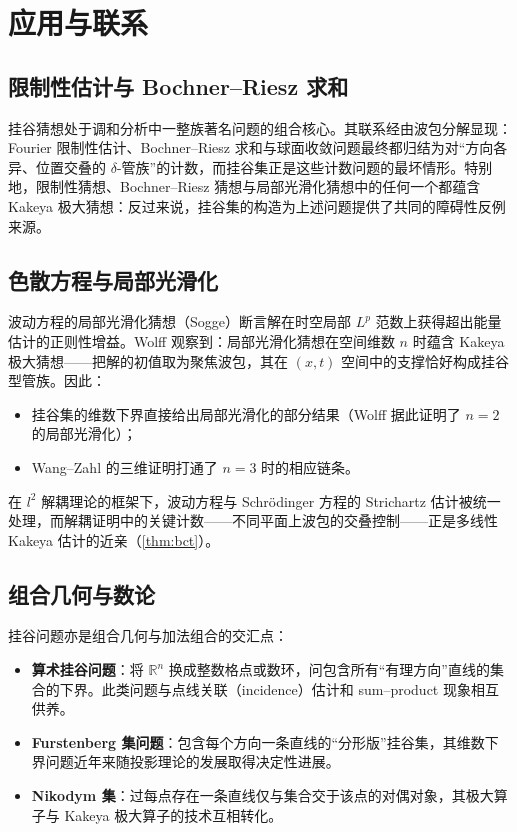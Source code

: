 \section{应用与联系}\label{sec:applications}

\subsection{限制性估计与 Bochner--Riesz 求和}

挂谷猜想处于调和分析中一整族著名问题的组合核心\cite{tao2001notices}。其联系经由波包分解显现：Fourier 限制性估计、Bochner--Riesz 求和与球面收敛问题最终都归结为对“方向各异、位置交叠的 $\delta$-管族”的计数，而挂谷集正是这些计数问题的最坏情形。特别地，限制性猜想、Bochner--Riesz 猜想与局部光滑化猜想中的任何一个都蕴含 Kakeya 极大猜想：反过来说，挂谷集的构造为上述问题提供了共同的障碍性反例来源。

\subsection{色散方程与局部光滑化}

波动方程的局部光滑化猜想（Sogge）断言解在时空局部 $L^p$ 范数上获得超出能量估计的正则性增益。Wolff 观察到：局部光滑化猜想在空间维数 $n$ 时蕴含 Kakeya 极大猜想——把解的初值取为聚焦波包，其在 $(x, t)$ 空间中的支撑恰好构成挂谷型管族\cite{tao2001notices}。因此：

\begin{itemize}
    \item 挂谷集的维数下界直接给出局部光滑化的部分结果（Wolff 据此证明了 $n = 2$ 的局部光滑化）；
    \item Wang--Zahl 的三维证明\cite{wangzahl2025}打通了 $n = 3$ 时的相应链条。
\end{itemize}

在 $l^2$ 解耦理论的框架下\cite{bourgaindemeter2015}，波动方程与 Schrödinger 方程的 Strichartz 估计被统一处理，而解耦证明中的关键计数——不同平面上波包的交叠控制——正是多线性 Kakeya 估计的近亲（\cref{thm:bct}）。

\subsection{组合几何与数论}

挂谷问题亦是组合几何与加法组合的交汇点\cite{tao2001notices}：

\begin{itemize}
    \item \textbf{算术挂谷问题}：将 $\mathbb{R}^n$ 换成整数格点或数环，问包含所有“有理方向”直线的集合的下界。此类问题与点线关联（incidence）估计和 sum--product 现象相互供养。
    \item \textbf{Furstenberg 集问题}：包含每个方向一条直线的“分形版”挂谷集，其维数下界问题近年来随投影理论的发展取得决定性进展。
    \item \textbf{Nikodym 集}：过每点存在一条直线仅与集合交于该点的对偶对象，其极大算子与 Kakeya 极大算子的技术互相转化。
\end{itemize}

